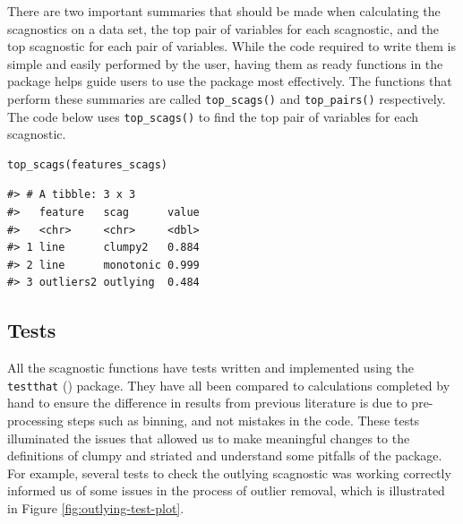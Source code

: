 There are two important summaries that should be made when calculating the scagnostics on a data set, the top pair of variables for each scagnostic, and the top scagnostic for each pair of variables. While the code required to write them is simple and easily performed by the user, having them as ready functions in the package helps guide users to use the package most effectively. The functions that perform these summaries are called \texttt{top\_scags()} and \texttt{top\_pairs()} respectively. The code below uses \texttt{top\_scags()} to find the top pair of variables for each scagnostic.

\begin{verbatim}
top_scags(features_scags)
\end{verbatim}

\begin{verbatim}
#> # A tibble: 3 x 3
#>   feature   scag      value
#>   <chr>     <chr>     <dbl>
#> 1 line      clumpy2   0.884
#> 2 line      monotonic 0.999
#> 3 outliers2 outlying  0.484
\end{verbatim}

\subsection{Tests}\label{tests}

All the scagnostic functions have tests written and implemented using the \texttt{testthat} (\citet{testthat}) package. They have all been compared to calculations completed by hand to ensure the difference in results from previous literature is due to pre-processing steps such as binning, and not mistakes in the code. These tests illuminated the issues that allowed us to make meaningful changes to the definitions of clumpy and striated and understand some pitfalls of the package. For example, several tests to check the outlying scagnostic was working correctly informed us of some issues in the process of outlier removal, which is illustrated in Figure \ref{fig:outlying-test-plot}.


